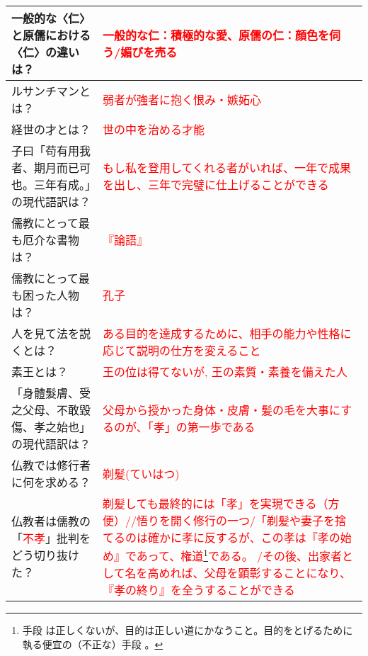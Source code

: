 \documentclass[a4paper,10pt]{article}
\begin{document}
\begin{longtable}{|p{}|p{}|}
一般的な〈仁〉と原儒における〈仁〉の違いは？ & \textcolor{red}{一般的な仁：積極的な愛、原儒の仁：顔色を伺う/媚びを売る} \\ \hline
ルサンチマンとは？ & \textcolor{red}{弱者が強者に抱く恨み・嫉妬心} \\ \hline
経世の才とは？ & \textcolor{red}{世の中を治める才能} \\ \hline
子曰「苟有用我者、期月而已可也。三年有成。」の現代語訳は？ & \textcolor{red}{もし私を登用してくれる者がいれば、一年で成果を出し、三年で完璧に仕上げることができる} \\ \hline
儒教にとって最も厄介な書物は？ & \textcolor{red}{『論語』} \\ \hline
儒教にとって最も困った人物は？ & \textcolor{red}{孔子} \\ \hline
人を見て法を説くとは？ & \textcolor{red}{ある目的を達成するために、相手の能力や性格に応じて説明の仕方を変えること} \\ \hline
素王とは？ & \textcolor{red}{王の位は得てないが, 王の素質・素養を備えた人} \\ \hline
「身體髮膚、受之父母、不敢毀傷、孝之始也」の現代語訳は？ & \textcolor{red}{父母から授かった身体・皮膚・髪の毛を大事にするのが、「孝」の第一歩である} \\ \hline
仏教では修行者に何を求める？ & \textcolor{red}{剃髪(ていはつ)} \\ \hline
仏教者は儒教の「\textcolor{red}{不孝}」批判をどう切り抜けた？ & \textcolor{red}{剃髪しても最終的には「孝」を実現できる（方便）//悟りを開く修行の一つ/「剃髪や妻子を捨てるのは確かに孝に反するが、この孝は『孝の始め』であって、権道\footnote{手段 は正しくないが、目的は正しい道にかなうこと。目的をとげるために執る便宜の（不正な）手段 。}である。
/その後、出家者として名を高めれば、父母を顕彰することになり、『孝の終り』を全うすることができる} \\ \hline
\end{longtable}
\end{document}
